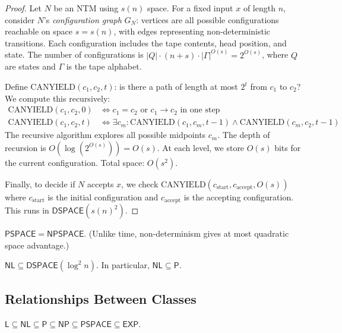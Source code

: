 \begin{proof}
Let $N$ be an NTM using $s(n)$ space. For a fixed input $x$ of length $n$, consider $N$'s \emph{configuration graph} $G_N$: vertices are all possible configurations reachable on space $s = s(n)$, with edges representing non-deterministic transitions. Each configuration includes the tape contents, head position, and state. The number of configurations is $|Q| \cdot (n + s) \cdot |\Gamma|^{O(s)} = 2^{O(s)}$, where $Q$ are states and $\Gamma$ is the tape alphabet.

Define $\text{CANYIELD}(c_1, c_2, t)$: is there a path of length at most $2^t$ from $c_1$ to $c_2$? We compute this recursively:
\begin{align*}
\text{CANYIELD}(c_1, c_2, 0) &\iff c_1 = c_2 \text{ or } c_1 \to c_2 \text{ in one step} \\
\text{CANYIELD}(c_1, c_2, t) &\iff \exists c_m : \text{CANYIELD}(c_1, c_m, t-1) \land \text{CANYIELD}(c_m, c_2, t-1)
\end{align*}
The recursive algorithm explores all possible midpoints $c_m$. The depth of recursion is $O(\log(2^{O(s)})) = O(s)$. At each level, we store $O(s)$ bits for the current configuration. Total space: $O(s^2)$.

Finally, to decide if $N$ accepts $x$, we check $\text{CANYIELD}(c_{\text{start}}, c_{\text{accept}}, O(s))$ where $c_{\text{start}}$ is the initial configuration and $c_{\text{accept}}$ is the accepting configuration. This runs in $\mathsf{DSPACE}(s(n)^2)$.
\end{proof}

\begin{corollary}
$\mathsf{PSPACE} = \mathsf{NPSPACE}$. (Unlike time, non-determinism gives at most quadratic space advantage.)
\end{corollary}

\begin{corollary}
$\mathsf{NL} \subseteq \mathsf{DSPACE}(\log^2 n)$. In particular, $\mathsf{NL} \subseteq \mathsf{P}$.
\end{corollary}

\subsection{Relationships Between Classes}
\label{sec:complexity:relationships}

\begin{theorem}
$\mathsf{L} \subseteq \mathsf{NL} \subseteq \mathsf{P} \subseteq \mathsf{NP} \subseteq \mathsf{PSPACE} \subseteq \mathsf{EXP}$.
\end{theorem}

